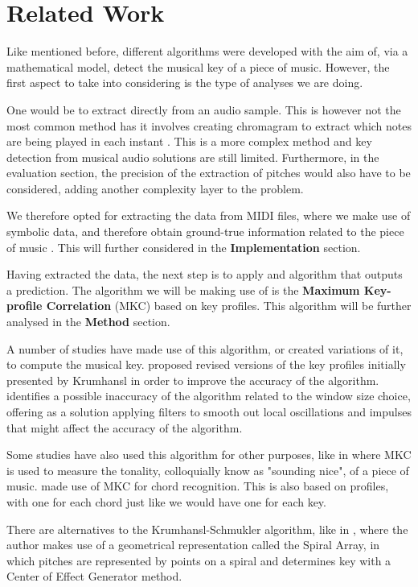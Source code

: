 \section{Related Work} \label{sec:related}

Like mentioned before, different algorithms were developed with the aim of, via a mathematical model, detect the musical key of a piece of music.
However, the first aspect to take into considering is the type of analyses we are doing.

One would be to extract directly from an audio sample.
This is however not the most common method has it involves creating chromagram to extract which notes are being played in each instant \cite{pauws2004musical}.
This is a more complex method and key detection from musical audio solutions are still limited.
Furthermore, in the evaluation section, the precision of the extraction of pitches would also have to be considered, adding another complexity layer to the problem.

We therefore opted for extracting the data from MIDI files, where we make use of symbolic data, and therefore obtain ground-true information related to the piece of music \cite{Raffel2016ExtractingGI}.
This will further considered in the \textbf{Implementation} section.

Having extracted the data, the next step is to apply and algorithm that outputs a prediction.
The algorithm we will be making use of is the \textbf{Maximum Key-profile Correlation} (MKC) \cite{krumhansl2001cognitive} based on key profiles. This algorithm will be further analysed in the \textbf{Method} section.

A number of studies have made use of this algorithm, or created variations of it, to compute the musical key.
\cite{Temperley2004Musicp} proposed revised versions of the key profiles initially presented by Krumhansl \cite{krumhansl2001cognitive} in order to improve the accuracy of the algorithm.
\cite{harjagraph} identifies a possible inaccuracy of the algorithm related to the window size choice, offering as a solution applying filters to smooth out local oscillations and impulses that might affect the accuracy of the algorithm.

Some studies have also used this algorithm for other purposes, like in \cite{takeuchi1994maximum} where MKC is used to measure the tonality, colloquially know as "sounding nice", of a piece of music.
\cite{lee2006automatic} made use of MKC for chord recognition. This is also based on profiles, with one for each chord just like we would have one for each key.

There are alternatives to the Krumhansl-Schmukler algorithm, like in \cite{chew2000towards},
where the author makes use of a geometrical representation called the Spiral Array, 
in which pitches are represented by points on a spiral and determines key with a Center of Effect Generator method.